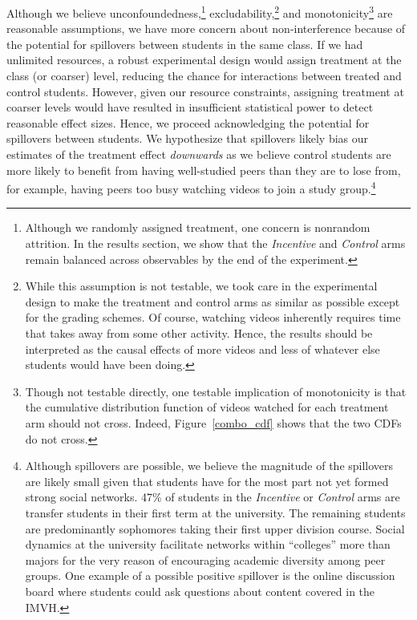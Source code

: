 \documentclass[12pt]{article}
\begin{document}
Although we believe unconfoundedness,\footnote{Although we randomly assigned treatment, one concern is nonrandom attrition. In the results section, we show that the \textit{Incentive} and \textit{Control} arms remain balanced across observables by the end of the experiment.} excludability,\footnote{While this assumption is not testable, we took care in the experimental design to make the treatment and control arms as similar as possible except for the grading schemes. Of course, watching videos inherently requires time that takes away from some other activity. Hence, the results should be interpreted as the causal effects of more videos and less of whatever else students would have been doing.} and monotonicity\footnote{Though not testable directly, one testable implication of monotonicity is that the cumulative distribution function of videos watched for each treatment arm should not cross. Indeed, Figure~\ref{combo_cdf} shows that the two CDFs do not cross.} are reasonable assumptions, we have more concern about non-interference because of the potential for spillovers between students in the same class.
If we had unlimited resources, a robust experimental design would assign treatment at the class (or coarser) level, reducing the chance for interactions between treated and control students.
However, given our resource constraints, assigning treatment at coarser levels would have resulted in insufficient statistical power to detect reasonable effect sizes.
Hence, we proceed acknowledging the potential for spillovers between students.
We hypothesize that spillovers likely bias our estimates of the treatment effect \textit{downwards} as we believe control students are more likely to benefit from having well-studied peers than they are to lose from, for example, having peers too busy watching videos to join a study group.\footnote{Although spillovers are possible, we believe the magnitude of the spillovers are likely small given that students have for the most part not yet formed strong social networks. 47\% of students in the \textit{Incentive} or \textit{Control} arms are transfer students in their first term at the university. The remaining students are predominantly sophomores taking their first upper division course. Social dynamics at the university facilitate networks within ``colleges'' more than majors for the very reason of encouraging academic diversity among peer groups. One example of a possible positive spillover is the online discussion board where students could ask questions about content covered in the IMVH.}
\end{document}
